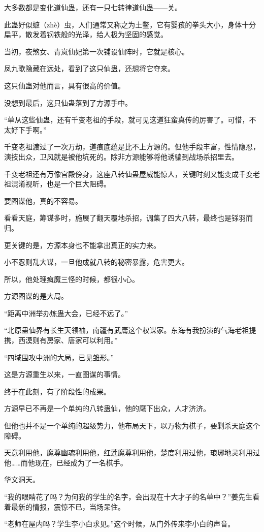\begin{this_body}
大多数都是变化道仙蛊，还有一只七转律道仙蛊——关。

此蛊好似蟅（zhè）虫，人们通常又称之为土鳖，它有婴孩的拳头大小，身体十分扁平，散发着钢铁般的光泽，给人极为坚固的感觉。

当初，夜煞女、青岚仙妃第一次铺设仙阵时，它就是核心。

凤九歌隐藏在远处，看到了这只仙蛊，还想将它夺来。

这只仙蛊对他而言，具有很高的价值。

没想到最后，这只仙蛊落到了方源手中。

“单从这些仙蛊，还有千变老祖的手段，就可见这道狂蛮真传的厉害了。可惜，不太好下手啊。”

千变老祖渡过了一次万劫，道痕底蕴是比不上方源的。但他手段丰富，性情隐忍，演技出众，卫风就是被他坑死的。除非方源能够将他诱骗到战场杀招里去。

千变老祖还有万像宫殿傍身，这座八转仙蛊屋威能惊人，关键时刻又能变成千变老祖混淆视听，也是一个巨大阻碍。

要图谋他，真的不容易。

看看天庭，筹谋多时，施展了翻天覆地杀招，调集了四大八转，最终也是铩羽而归。

更关键的是，方源本身也不能拿出真正的实力来。

小不忍则乱大谋，一旦他成就八转的秘密暴露，危害更大。

所以，他处理疯魔三怪的时候，都很小心。

方源图谋的是大局。

“距离中洲举办炼蛊大会，已经不远了。”

“北原蛊仙界有长生天领袖，南疆有武庸这个权谋家。东海有我扮演的气海老祖提携，西漠则有房家、唐家可以利用。”

“四域围攻中洲的大局，已见雏形。”

这是方源重生以来，一直图谋的事情。

终于在此刻，有了阶段性的成果。

方源早已不再是一个单纯的八转蛊仙，他的麾下出众，人才济济。

但他也并不是一个单纯的超级势力，他布局天下，以万物为棋子，要剿杀天庭这个障碍。

天意利用他，魔尊幽魂利用他，红莲魔尊利用他，楚度利用过他，琅琊地灵利用过他……而他现在，已经成为了一名棋手。

华文洞天。

“我的眼睛花了吗？为何我的学生的名字，会出现在十大才子的名单中？”姜先生看着最新的情报，震惊不已，当场呆住。

“老师在屋内吗？学生李小白求见。”这个时候，从门外传来李小白的声音。


\end{this_body}
